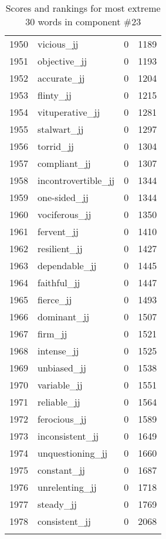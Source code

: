 \begin{longtable}[!htbp]{| rlr@{.}l |}
    1950 & vicious\_jj & 0 & 1189 \\
    1951 & objective\_jj & 0 & 1193 \\
    1952 & accurate\_jj & 0 & 1204 \\
    1953 & flinty\_jj & 0 & 1215 \\
    1954 & vituperative\_jj & 0 & 1281 \\
    1955 & stalwart\_jj & 0 & 1297 \\
    1956 & torrid\_jj & 0 & 1304 \\
    1957 & compliant\_jj & 0 & 1307 \\
    1958 & incontrovertible\_jj & 0 & 1344 \\
    1959 & one-sided\_jj & 0 & 1344 \\
    1960 & vociferous\_jj & 0 & 1350 \\
    1961 & fervent\_jj & 0 & 1410 \\
    1962 & resilient\_jj & 0 & 1427 \\
    1963 & dependable\_jj & 0 & 1445 \\
    1964 & faithful\_jj & 0 & 1447 \\
    1965 & fierce\_jj & 0 & 1493 \\
    1966 & dominant\_jj & 0 & 1507 \\
    1967 & firm\_jj & 0 & 1521 \\
    1968 & intense\_jj & 0 & 1525 \\
    1969 & unbiased\_jj & 0 & 1538 \\
    1970 & variable\_jj & 0 & 1551 \\
    1971 & reliable\_jj & 0 & 1564 \\
    1972 & ferocious\_jj & 0 & 1589 \\
    1973 & inconsistent\_jj & 0 & 1649 \\
    1974 & unquestioning\_jj & 0 & 1660 \\
    1975 & constant\_jj & 0 & 1687 \\
    1976 & unrelenting\_jj & 0 & 1718 \\
    1977 & steady\_jj & 0 & 1769 \\
    1978 & consistent\_jj & 0 & 2068 \\
    \hline
    \caption{Scores and rankings for most extreme 30 words in component \#23} \\
\end{longtable}
